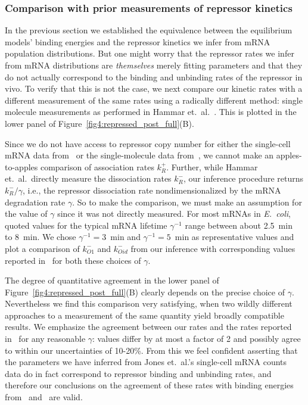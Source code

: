 \subsubsection{Comparison with prior measurements of repressor kinetics}
In the previous section we established the equivalence between the equilibrium
models' binding energies and the repressor kinetics we infer from mRNA
population distributions. But one might worry that the repressor rates we infer
from mRNA distributions are \textit{themselves} merely fitting parameters and
that they do not actually correspond to the binding and unbinding rates of the
repressor in vivo. To verify that this is not the case, we next compare our
kinetic rates with a different measurement of the same rates using a radically
different method: single molecule measurements as performed in Hammar et.\
al.~\cite{Hammar2014}. This is plotted in the lower panel of
Figure~\ref{fig4:repressed_post_full}(B).

Since we do not have access to repressor copy number for either the
single-cell mRNA data from~\cite{Jones2014} or the single-molecule data
from~\cite{Hammar2014}, we cannot make an apples-to-apples comparison of
association rates $k_R^+$. Further, while Hammar et.\ al.\ directly measure the
dissociation rates $k_R^-$, our inference procedure returns $k_R^-/\gamma$,
i.e., the repressor dissociation rate nondimensionalized by the mRNA degradation
rate $\gamma$. So to make the comparison, we must make an assumption for the
value of $\gamma$ since it was not directly measured. For most mRNAs in
\textit{E.\ coli}, quoted values for the typical mRNA lifetime $\gamma^{-1}$
range between about 2.5~min~\cite{Chen2015} to 8~min. We chose $\gamma^{-1} =
3$~min and $\gamma^{-1} = 5$~min as representative values and plot a comparison
of $k_{O1}^-$ and $k_{Oid}^-$ from our inference with corresponding values
reported in~\cite{Hammar2014} for both these choices of $\gamma$.

The degree of quantitative agreement in the lower panel of
Figure~\ref{fig4:repressed_post_full}(B) clearly depends on the precise choice
of $\gamma$. Nevertheless we find this comparison very satisfying, when two
wildly different approaches to a measurement of the same quantity yield broadly
compatible results. We emphasize the agreement between our rates and the rates
reported in~\cite{Hammar2014} for any reasonable $\gamma$: values differ by at
most a factor of 2 and possibly agree to within our uncertainties of 10-20\%.
From this we feel confident asserting that the parameters we have inferred from
Jones et.\ al.'s single-cell mRNA counts data do in fact correspond to repressor
binding and unbinding rates, and therefore our conclusions on the agreement of
these rates with binding energies from~\cite{Garcia2011a}
and~\cite{Razo-Mejia2018} are valid.

